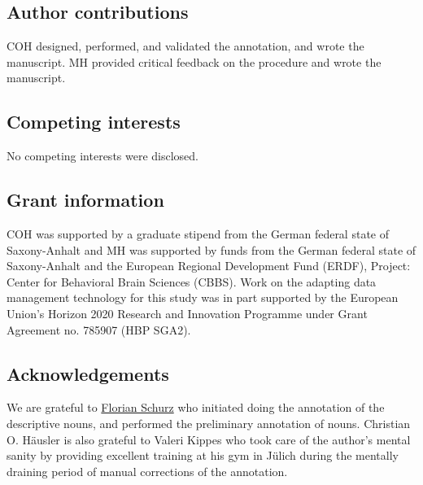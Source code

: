 \documentclass[10pt,a4paper,onecolumn]{article}
\begin{document}
\subsection*{Author contributions}
COH designed, performed, and validated the annotation, and wrote the manuscript.
MH provided critical feedback on the procedure and wrote the manuscript.

\subsection*{Competing interests}
No competing interests were disclosed.

\subsection*{Grant information}

COH was supported by a graduate stipend from the German federal state of
Saxony-Anhalt and MH was supported by funds from the German federal state of
Saxony-Anhalt and the European Regional Development Fund (ERDF), Project:
Center for Behavioral Brain Sciences (CBBS). Work on the adapting data
management technology for this study was in part supported by the European
Union's Horizon 2020 Research and Innovation Programme under Grant Agreement
no. 785907 (HBP SGA2).


\subsection*{Acknowledgements}
We are grateful to \href{www.florianschurz.de}{Florian Schurz} who initiated doing the annotation of the descriptive nouns, and performed the preliminary annotation of nouns. Christian O. Häusler is also grateful to Valeri Kippes who took care of the author's mental sanity by providing excellent training at his gym in Jülich during the mentally draining period of manual corrections of the annotation.

{\small
}
\end{document}
